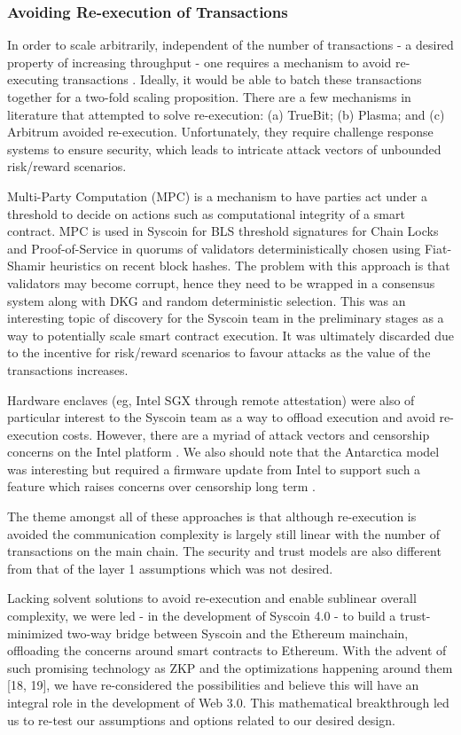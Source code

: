 \documentclass[peerreview]{ieeesyscoin}
\begin{document}
\subsubsection{Avoiding Re-execution of Transactions}

In order to scale arbitrarily, independent of the number of transactions - a desired property of increasing throughput - one requires a mechanism to avoid re-executing transactions \cite{Bow18}. Ideally, it would be able to batch these transactions together for a two-fold scaling proposition. There are a few mechanisms in literature that attempted to solve re-execution:
(a) TrueBit; (b) Plasma; and (c) Arbitrum avoided re-execution. Unfortunately, they require challenge response systems to ensure security, which leads to intricate attack vectors of unbounded risk/reward scenarios. 

Multi-Party Computation (MPC) is a mechanism to have parties act under a threshold to decide on actions such as computational integrity of a smart contract. MPC is used in Syscoin for BLS threshold signatures for Chain Locks and Proof-of-Service in quorums of validators deterministically chosen using Fiat-Shamir heuristics on recent block hashes. The problem with this approach is that validators may become corrupt, hence they need to be wrapped in a consensus system along with DKG and random deterministic selection. This was an interesting topic of discovery for the Syscoin team in the preliminary stages as a way to potentially scale smart contract execution.  It was ultimately discarded due to the incentive for risk/reward scenarios to favour attacks as the value of the transactions increases.

Hardware enclaves (eg, Intel SGX through remote attestation) were also of particular interest to the Syscoin team as a way to offload execution and avoid re-execution costs. However, there are a myriad of attack vectors and censorship concerns on the Intel platform . We also should note that the Antarctica model was interesting but required a firmware update from Intel to support such a feature which raises concerns over censorship long term \cite{Nil20}.

The theme amongst all of these approaches is that although re-execution is avoided the communication complexity is largely still linear with the number of transactions on the main chain. The security and trust models are also different from that of the layer 1 assumptions which was not desired.

Lacking solvent solutions to avoid re-execution and enable sublinear overall complexity, we were led - in the development of Syscoin 4.0 - to build a trust-minimized two-way bridge between Syscoin and the Ethereum mainchain, offloading the concerns around smart contracts to Ethereum. With the advent of such promising technology as ZKP and the optimizations happening around them [18, 19], we have re-considered the possibilities and believe this will have an integral role in the development of Web 3.0. This mathematical breakthrough led us to re-test our assumptions and options related to our desired design.
\end{document}
